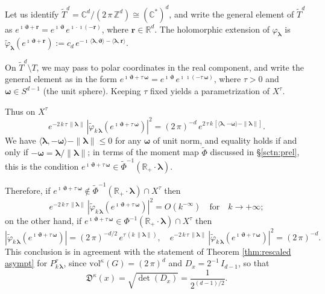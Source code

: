 \documentclass[12pt,a4paper]{article}
\theoremstyle{plain}
\theoremstyle{definition}
\begin{document}
Let us identify $\tilde{T}^d=\mathbb{C}^d/(2\,\pi\,\mathbb{Z}^d)\cong (\mathbb{C}^*)^d$, and write the
general element of
$\tilde{T}^d$ as $e^{\imath\,\boldsymbol{\vartheta}+\mathbf{r}}
=e^{\imath\,\boldsymbol{\vartheta}}\,
e^{\imath \cdot \imath (-\mathbf{r})}$,
where $\mathbf{r}\in \mathbb{R}^d$. The holomorphic extension of
$\varphi_{\boldsymbol{\lambda}}$ is
$\tilde{\varphi}_{\boldsymbol{\lambda}}(e^{\imath\,\boldsymbol{\vartheta}+\mathbf{r}}):=c_d\,
e^{-\imath\,
\langle\boldsymbol{\lambda},\boldsymbol{\vartheta}
\rangle
-\langle
\boldsymbol{\lambda},\mathbf{r}
\rangle
}$. 



On $\tilde{T}^d\setminus T$, we may pass to polar coordinates in the real component, and write the general element as
in the form
$e^{\imath\,\boldsymbol{\vartheta}+\tau\,\boldsymbol{\omega}}
=e^{\imath\,\boldsymbol{\vartheta}}\,
e^{\imath\,\imath (-\tau\,\boldsymbol{\omega})}$, where 
$\tau>0$ and $\boldsymbol{\omega}\in S^{d-1}$ (the unit sphere).
Keeping $\tau$ fixed yields a parametrization of $X^\tau$.

Thus on $X^\tau$ 
$$
e^{-2\,k\,\tau\,\|\boldsymbol{\lambda}\|}\,\left|\tilde{\varphi}_{k\,\boldsymbol{\lambda}}(e^{\imath\,\boldsymbol{\vartheta}+\tau\,\boldsymbol{\omega}})
\right|^2
=(2\,\pi)^{-d}\,
e^{2\,\tau\,k\,\left[\langle\boldsymbol{\lambda},
-\boldsymbol{\omega}\rangle-\|\boldsymbol{\lambda}\|\right]}.
$$
We have $\langle\boldsymbol{\lambda},
-\boldsymbol{\omega}\rangle-\|\boldsymbol{\lambda}\|\le 0$ for any
$\boldsymbol{\omega}$ of unit norm, and equality holds if and only if
$-\boldsymbol{\omega}=
\boldsymbol{\lambda}/\|\boldsymbol{\lambda}\|$; 
in terms
of the moment map $\tilde{\Phi}$ discussed in
\S \ref{sctn:prel}, this is 
the condition $e^{\imath\,\boldsymbol{\vartheta}
+\tau\,\boldsymbol{\omega}}\in 
{\tilde{\Phi}}^{-1}(\mathbb{R}_+\cdot\boldsymbol{\lambda})$.

Therefore, if $e^{\imath\,\boldsymbol{\vartheta}+\tau\,\boldsymbol{\omega}}
\not\in 
{\tilde{\Phi}}^{-1}(\mathbb{R}_+\cdot\boldsymbol{\lambda})\cap X^\tau$ then
$$
e^{-2\,k\,\tau\,\|\boldsymbol{\lambda}\|}\,\left|\tilde{\varphi}_{k\,\boldsymbol{\lambda}}(e^{\imath\,\boldsymbol{\vartheta}+\tau\,\boldsymbol{\omega}})
\right|^2=O\left(k^{-\infty}\right)\quad\text{for}\quad
k\rightarrow+\infty;
$$
on the other hand, if
$e^{\imath\,\boldsymbol{\vartheta}+\tau\,\boldsymbol{\omega}}\in 
\Phi^{-1}(\mathbb{R}_+\cdot\boldsymbol{\lambda})\cap X^\tau$ then
$$
\left|\tilde{\varphi}_{k\,\boldsymbol{\lambda}}(e^{\imath\,\boldsymbol{\vartheta}+\tau\,\boldsymbol{\omega}})
\right|
=(2\,\pi)^{-d/2}\,e^{\tau\,(k\,\|\boldsymbol{\lambda}\|)}
,\quad
e^{-2\,k\,\tau\,\|\boldsymbol{\lambda}\|}\,\left|\tilde{\varphi}_{k\,\boldsymbol{\lambda}}(e^{\imath\,\boldsymbol{\vartheta}+\tau\,\boldsymbol{\omega}})
\right|^2
=(2\,\pi)^{-d}.
$$
This conclusion is in agreement with the statement of
Theorem \ref{thm:rescaled asympt} for $P^\tau_{k\,\boldsymbol{\lambda}}$,
since $\mathrm{vol}^\kappa(G)=(2\,\pi)^d$ and
$D_x=2^{-1}\,I_{d-1}$, so that
$$
\mathfrak{D}^\kappa(x)=\sqrt{\det(D_x)}
=\frac{1}{2^{(d-1)/2}}.
$$
\end{document}
